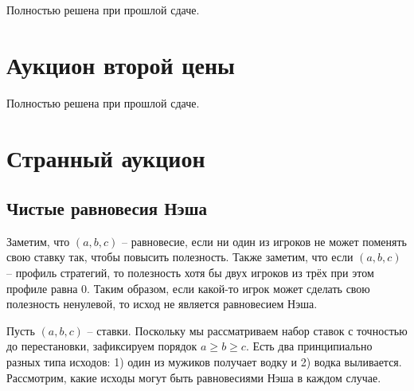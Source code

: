 \documentclass[a4paper,11pt,notitlepage]{article}
\begin{document}
Полностью решена при прошлой сдаче.

\section{Аукцион второй цены}

Полностью решена при прошлой сдаче.

\section{Странный аукцион}
\subsection{Чистые равновесия Нэша}
Заметим, что $(a, b, c)$ -- равновесие, если ни один из игроков не может поменять свою ставку так, чтобы повысить полезность. Также заметим, что если $(a, b, c)$ -- профиль стратегий, то полезность хотя бы двух игроков из трёх при этом профиле равна 0. Таким образом, если какой-то игрок может сделать свою полезность ненулевой, то исход не является равновесием Нэша.

Пусть $(a, b, c)$ -- ставки. Поскольку мы рассматриваем набор ставок с точностью до перестановки, зафиксируем порядок $a \geq b \geq c$. Есть два принципиально разных типа исходов: 1) один из мужиков получает водку и 2) водка выливается. Рассмотрим, какие исходы могут быть равновесиями Нэша в каждом случае.
\end{document}
